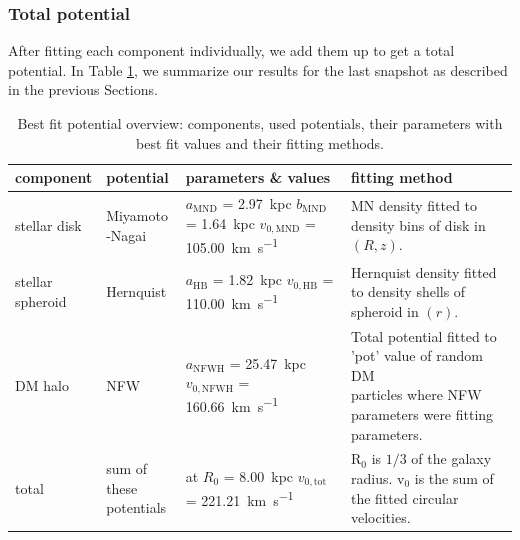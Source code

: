 \subsubsection{Total potential}\label{subsubsec:tot_pot}
After fitting each component individually, we add them up to get a total potential. In Table \ref{tab:pot_best_fit_params}, we summarize our results for the last snapshot as described in the previous Sections. 

\begin{table}[htbp]
\captionsetup{format=plain}
    \centering
    \begin{tabular}{@{}llll@{}}
         \toprule
         component& potential & parameters \& values &fitting method  \\
         \midrule
         stellar disk& \makecell[tl]{Miyamoto\\-Nagai}&\makecell[tl]{$a_{\mathrm{MND}}$ = \SI{2.97}{kpc}\\$b_{\mathrm{MND}}$ = \SI{1.64}{kpc}\\$v_{0,\mathrm{MND}}$ = \SI{105.00}{km.s^{-1}}} & \makecell[tl]{\ac{MN} density fitted \\to density bins \\of disk in $(R,z)$.}\vspace{3mm}\\
         \makecell[tl]{stellar\\ spheroid}& Hernquist&\makecell[tl]{$a_{\mathrm{HB}}$ = \SI{1.82}{kpc}\\$v_{0,\mathrm{HB}}$ = \SI{110.00}{km.s^{-1}}}& \makecell[tl]{Hernquist density fitted\\ to density shells of \\spheroid in $(r)$.}\vspace{3mm}\\
         \ac{DM} halo&\ac{NFW}&\makecell[tl]{$a_{\mathrm{NFWH}}$ = \SI{25.47}{kpc}\\$v_{0,\mathrm{NFWH}}$ = \SI{160.66}{km.s^{-1}}}&\makecell[tl]{Total potential fitted to \\'pot' value of random \ac{DM} \\particles where \ac{NFW}\\ parameters were fitting \\parameters.}\vspace{3mm}\\
         total & \makecell[tl]{sum of these\\ potentials} & \makecell[tl]{at $R_0$ = \SI{8.00}{kpc} \\ $v_{0,\mathrm{tot}}$ = \SI{221.21}{km.s^{-1}}}& \makecell[tl]{R$_0$ is $1/3$ of the galaxy \\radius. v$_0$ is the sum of \\the fitted circular velocities.}\vspace{3mm}\\
         \bottomrule 
    \end{tabular}
    \caption{Best fit potential overview: components, used potentials, their parameters with best fit values and their fitting methods.}
    \label{tab:pot_best_fit_params}
\end{table}

